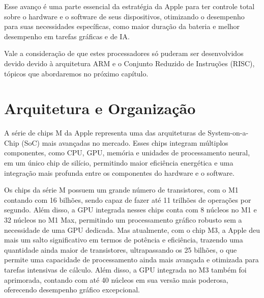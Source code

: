\documentclass[a4paper,times,12pt]{article}
\begin{document}
Esse avanço é uma parte essencial da estratégia da Apple para ter controle total sobre o hardware e o software de seus dispositivos, otimizando o desempenho para suas necessidades específicas, como maior duração da bateria e melhor desempenho em tarefas gráficas e de IA. 

Vale a consideração de que estes processadores só puderam ser desenvolvidos devido devido à arquitetura ARM e o Conjunto Reduzido de Instruções (RISC), tópicos que abordaremos no próximo capítulo.

\section{Arquitetura e Organização}

\hspace*{+15pt} A série de chips M da Apple representa uma das arquiteturas de System-on-a-Chip (SoC) mais avançadas no mercado. Esses chips integram múltiplos componentes, como CPU, GPU, memória e unidades de processamento neural, em um único chip de silício, permitindo maior eficiência energética e uma integração mais profunda entre os componentes do hardware e o software.

Os chips da série M possuem um grande número de transistores, com o M1 contando com 16 bilhões, sendo capaz de fazer até 11 trilhões de operações por segundo. Além disso, a GPU integrada nesses chips conta com 8 núcleos no M1 e 32 núcleos no M1 Max, permitindo um processamento gráfico robusto sem a necessidade de uma GPU dedicada. Mas atualmente, com o chip M3, a Apple deu mais um salto significativo em termos de potência e eficiência, trazendo uma quantidade ainda maior de transistores, ultrapassando os 25 bilhões, o que permite uma capacidade de processamento ainda mais avançada e otimizada para tarefas intensivas de cálculo. Além disso, a GPU integrada no M3 também foi aprimorada, contando com até 40 núcleos em sua versão mais poderosa, oferecendo desempenho gráfico excepcional.
\end{document}
